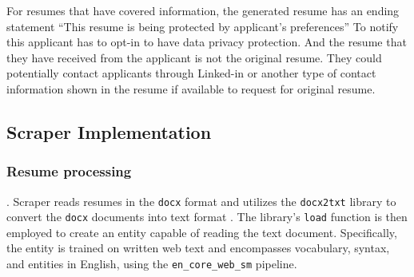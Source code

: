 \documentclass{article}
\begin{document}
For resumes that have covered information, the generated resume has an ending statement “This resume is being protected by applicant's preferences” To notify this applicant has to opt-in to have data privacy protection. And the resume that they have received from the applicant is not the original resume. They could potentially contact applicants through Linked-in or another type of contact information shown in the resume if available to request for original resume.
\subsection{Scraper Implementation}
\subsubsection{Resume processing}
.
Scraper reads resumes in the \texttt{docx} format and utilizes the \texttt{docx2txt} library to convert the \texttt{docx} documents into text format . The library's \texttt{load} function is then employed to create an entity capable of reading the text document. Specifically, the entity is trained on written web text and encompasses vocabulary, syntax, and entities in English, using the \texttt{en\_core\_web\_sm} pipeline.
\end{document}
